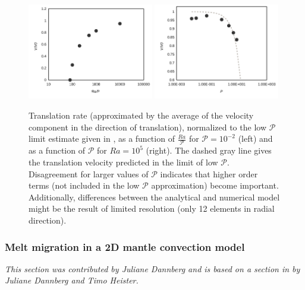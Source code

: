 \documentclass{article}
\begin{document}
\begin{figure}
    \centering
    \includegraphics[width=0.49\textwidth]{cookbooks/inner_core_convection/translation_over_Ra_P.pdf}
    \hfill
    \includegraphics[width=0.49\textwidth]{cookbooks/inner_core_convection/translation_over_P.pdf}
    \caption{Translation rate (approximated by the average of the velocity component in the direction of translation), 
    normalized to the low $\mathcal{P}$ 
    limit estimate given in \cite{Deguen2013}, as a function of $\frac{Ra}{\mathcal{P}}$ for $\mathcal{P}=10^{-2}$ 
    (left) and as a function of $\mathcal{P}$ for $Ra=10^5$ (right).
    The dashed gray line gives the translation velocity predicted in the limit of low $\mathcal{P}$. Disagreement 
    for larger values of $\mathcal{P}$ indicates that higher order terms (not included in the low $\mathcal{P}$
    approximation) become important. Additionally, differences between the analytical and numerical model might 
    be the result of limited resolution (only 12 elements in radial direction).}
    \label{fig:inner-core-trends}
\end{figure}

\subsubsection{Melt migration in a 2D mantle convection model}
\label{sec:cookbooks-melt-global}

\textit{This section was contributed by Juliane Dannberg and is based on a section in \cite{dannberg_melt} by Juliane Dannberg and Timo Heister.}
\end{document}
